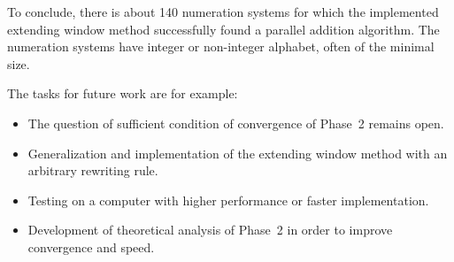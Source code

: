  To conclude, there is about 140 numeration systems for which the implemented extending window method successfully found a parallel addition algorithm. The numeration systems have integer or non-integer alphabet, often of the minimal size.

The tasks for future work are for example:
\begin{itemize}
	\item The question of sufficient condition of convergence of Phase~2 remains open.
	\item Generalization and implementation of the extending window method with an arbitrary rewriting rule.
	\item Testing on a  computer with higher performance or faster implementation.
	\item Development of theoretical analysis of Phase~2 in order to improve convergence and speed.
\end{itemize}



